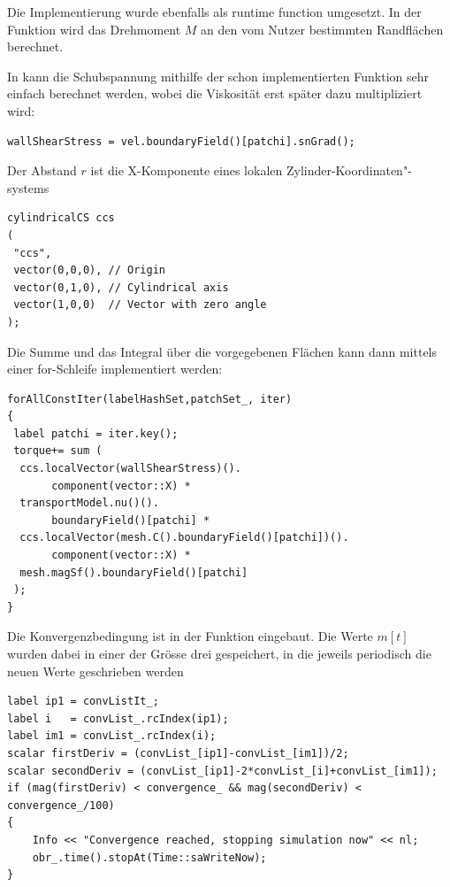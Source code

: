 Die Implementierung wurde ebenfalls als runtime function umgesetzt. In der Funktion  wird das Drehmoment $M$ an den vom Nutzer bestimmten Randflächen berechnet.

In \openfoam{} kann die Schubspannung mithilfe der schon implementierten Funktion  sehr einfach berechnet werden, wobei die Viskosität erst später dazu multipliziert wird:
%
\begin{lstlisting}
wallShearStress = vel.boundaryField()[patchi].snGrad();
\end{lstlisting}

Der Abstand $r$ ist die X-Komponente eines lokalen Zylinder-Koordinaten"-systems
\begin{lstlisting}
cylindricalCS ccs
(
 "ccs",
 vector(0,0,0), // Origin
 vector(0,1,0), // Cylindrical axis
 vector(1,0,0)  // Vector with zero angle
);
\end{lstlisting}
%
Die Summe und das Integral über die vorgegebenen Flächen kann dann mittels einer for-Schleife implementiert werden:
\begin{lstlisting}
forAllConstIter(labelHashSet,patchSet_, iter)
{
 label patchi = iter.key();
 torque+= sum (
  ccs.localVector(wallShearStress)().
       component(vector::X) *
  transportModel.nu()().
       boundaryField()[patchi] * 
  ccs.localVector(mesh.C().boundaryField()[patchi])().
       component(vector::X) *
  mesh.magSf().boundaryField()[patchi]
 );
}
\end{lstlisting}
%
Die Konvergenzbedingung ist in der Funktion  eingebaut.
%
Die Werte $m[t]$ wurden dabei in einer  der Grösse drei gespeichert, in die jeweils periodisch die neuen Werte geschrieben werden
%
\begin{lstlisting}
label ip1 = convListIt_;
label i   = convList_.rcIndex(ip1);
label im1 = convList_.rcIndex(i);
scalar firstDeriv = (convList_[ip1]-convList_[im1])/2;
scalar secondDeriv = (convList_[ip1]-2*convList_[i]+convList_[im1]);
if (mag(firstDeriv) < convergence_ && mag(secondDeriv) < convergence_/100)
{
    Info << "Convergence reached, stopping simulation now" << nl;
    obr_.time().stopAt(Time::saWriteNow);
}
\end{lstlisting}
%
%

%
